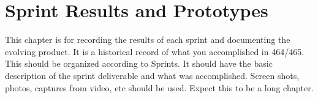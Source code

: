 
\chapter{Sprint Results and Prototypes}

This chapter is for recording the results of each sprint and documenting the evolving product.    
It is a historical record of what you accomplished in 464/465.   
This should be organized according to Sprints.  
It should have the basic description of the sprint deliverable and what was accomplished.  
Screen shots, photos, captures from video, etc should be used.   
Expect this to be a long chapter.    





